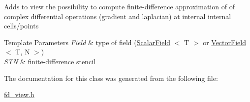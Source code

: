 Adds to view the possibility to compute finite-\/difference approximation of of complex differential operations (gradient and laplacian) at internal internal cells/points


\begin{DoxyTemplParams}{Template Parameters}
{\em Field} & type of field (\hyperlink{structUintah_1_1PhaseField_1_1ScalarField}{Scalar\+Field} $<$ T $>$ or \hyperlink{structUintah_1_1PhaseField_1_1VectorField}{Vector\+Field} $<$ T, N $>$) \\
\hline
{\em S\+TN} & finite-\/difference stencil \\
\hline
\end{DoxyTemplParams}


The documentation for this class was generated from the following file\+:\begin{DoxyCompactItemize}
\item 
\hyperlink{fd__view_8h}{fd\+\_\+view.\+h}\end{DoxyCompactItemize}
